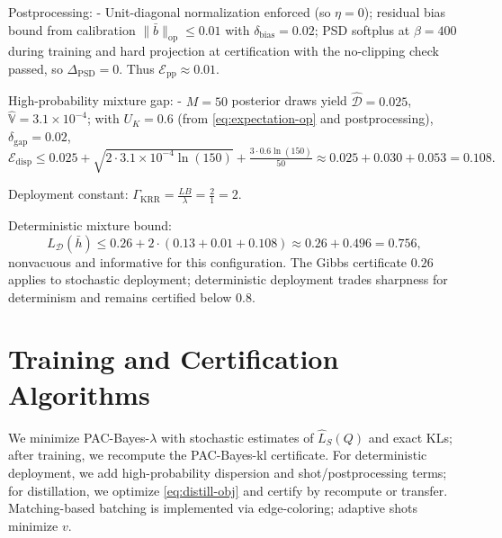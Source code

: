 \documentclass{article}
\begin{document}
Postprocessing:
- Unit-diagonal normalization enforced (so $\eta=0$); residual bias bound from calibration $\|\bar{b}\|_{\mathrm{op}}\le 0.01$ with $\delta_{\mathrm{bias}}=0.02$; PSD softplus at $\beta=400$ during training and hard projection at certification with the no-clipping check passed, so $\Delta_{\mathrm{PSD}}=0$. Thus $\mathcal{E}_{\mathrm{pp}}\approx 0.01$.

High-probability mixture gap:
- $M=50$ posterior draws yield $\widehat{\mathcal{D}}=0.025$, $\widehat{\mathbb{V}}=3.1\times 10^{-4}$; with $U_K=0.6$ (from \eqref{eq:expectation-op} and postprocessing), $\delta_{\mathrm{gap}}=0.02$,
$\mathcal{E}_{\mathrm{disp}}\le 0.025 + \sqrt{2\cdot 3.1\!\times\!10^{-4}\ln(150)} + \frac{3\cdot 0.6\ln(150)}{50} \approx 0.025 + 0.030 + 0.053 = 0.108.$

Deployment constant: $\Gamma_{\mathrm{KRR}}=\frac{LB}{\lambda}=\frac{2}{1}=2$.

Deterministic mixture bound:
\[
L_\mathcal{D}(\bar{h}) \le 0.26 + 2\cdot (0.13+0.01+0.108)\approx 0.26 + 0.496 = 0.756,
\]
nonvacuous and informative for this configuration. The Gibbs certificate $0.26$ applies to stochastic deployment; deterministic deployment trades sharpness for determinism and remains certified below $0.8$.

\section{Training and Certification Algorithms}\label{sec:algorithms}
We minimize PAC-Bayes-$\lambda$ with stochastic estimates of $\hat{L}_S(Q)$ and exact KLs; after training, we recompute the PAC-Bayes-kl certificate. For deterministic deployment, we add high-probability dispersion and shot/postprocessing terms; for distillation, we optimize \eqref{eq:distill-obj} and certify by recompute or transfer. Matching-based batching is implemented via edge-coloring; adaptive shots minimize $v$.
\end{document}
